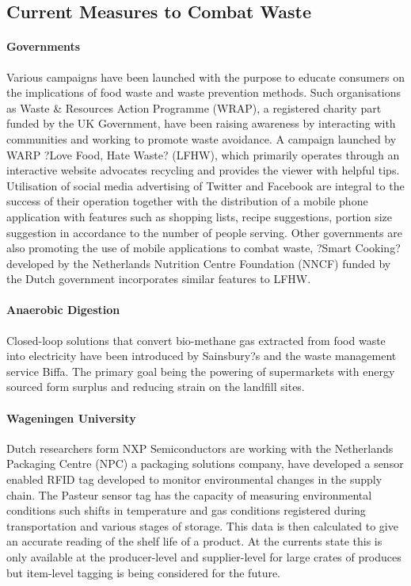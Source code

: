 \documentclass[a4paper, 11pt]{article}
\begin{document}
\subsection{Current Measures to Combat Waste}

\paragraph{Governments} Various campaigns have been launched with the purpose to educate consumers on the implications of food waste and waste prevention methods. Such organisations as Waste \& Resources Action Programme (WRAP), a registered charity part funded by the UK Government, have been raising awareness by interacting with communities and working to promote waste avoidance. A campaign launched by WARP ?Love Food, Hate Waste? (LFHW), which primarily operates through an interactive website advocates recycling and provides the viewer with helpful tips. Utilisation of social media advertising of Twitter and Facebook are integral to the success of their operation together with the distribution of a mobile phone application with features such as shopping lists, recipe suggestions, portion size suggestion in accordance to the number of people serving. Other governments are also promoting the use of mobile applications to combat waste, ?Smart Cooking? developed by the Netherlands Nutrition Centre Foundation (NNCF) funded by the Dutch government incorporates similar features to LFHW.

\paragraph{Anaerobic Digestion}Closed-loop solutions that convert bio-methane gas extracted from food waste into electricity have been introduced by Sainsbury?s and the waste management service Biffa. The primary goal being the powering of supermarkets with energy sourced form surplus and reducing strain on the landfill sites.

\paragraph{Wageningen University}Dutch researchers form NXP Semiconductors are working with the Netherlands Packaging Centre (NPC) a packaging solutions company, have developed a sensor enabled RFID tag developed to monitor environmental changes in the supply chain. The Pasteur sensor tag has the capacity of measuring environmental conditions such shifts in temperature and gas conditions registered during transportation and various stages of storage. This data is then calculated to give an accurate reading of the shelf life of a product. At the currents state this is only available at the producer-level and supplier-level for large crates of produces but item-level tagging is being considered for the future. 
\end{document}
